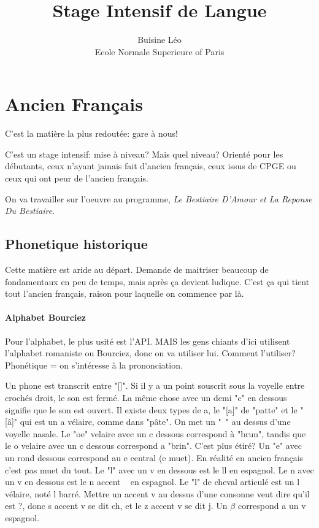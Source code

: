 \documentclass[a4paper]{report}
\theoremstyle{definition}
\theoremstyle{remark}
\begin{document}
\title{Stage Intensif de Langue}
\author{Buisine Léo\\Ecole Normale Superieure of Paris}
\maketitle

\tableofcontents

\chapter{Ancien Français}

C'est la matière la plus redoutée: gare à nous! \par

C'est un stage intensif: mise à niveau? Mais quel niveau? Orienté pour les débutants, ceux n'ayant jamais fait d'ancien français, ceux issus de CPGE ou ceux qui ont peur de l'ancien français. \par

On va travailler sur l'oeuvre au programme, \textit{Le Bestiaire D'Amour et La Reponse Du Bestiaire}.

\section{Phonetique historique}

Cette matière est aride au départ. Demande de maitriser beaucoup de fondamentaux en peu de temps, mais après ça devient ludique. C'est ça qui tient tout l'ancien français, raison pour laquelle on commence par là. \par

\subsubsection{Alphabet Bourciez}

Pour l'alphabet, le plus usité est l'API. MAIS les gens chiants d'ici utilisent l'alphabet romaniste ou Bourciez, donc on va utiliser lui. Comment l'utiliser? Phonétique = on s'intéresse à la prononciation. \par 

Un phone est transcrit entre "[]". Si il y a un point souscrit sous la voyelle entre crochés droit, le son est fermé. La même chose avec un demi "c" en dessous signifie que le son est ouvert. Il existe deux types de a, le "[a]" de "patte" et le "[â]" qui est un a vélaire, comme dans "pâte". On met un "~" au dessus d'une voyelle nasale. Le "oe" velaire avec un c dessous correspond à "brun", tandis que le o velaire avec un c dessous correspond a "brin". C'est plus étiré? Un "e" avec un rond dessous correspond au e central (e muet). En réalité en ancien français c'est pas muet du tout. Le "l" avec un v en dessous est le ll en espagnol. Le n avec un v en dessous est le n accent ~ en espagnol. Le "l" de cheval articulé est un l vélaire, noté l barré. Mettre un accent v au dessus d'une consonne veut dire qu'il est ?, donc s accent v se dit ch, et le z accent v se dit j. Un $\beta$ correspond a un v espagnol.\par 
\end{document}
